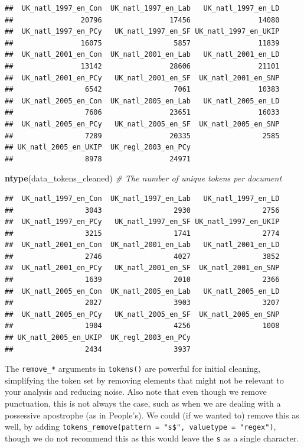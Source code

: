 \documentclass[
]{book}
\newenvironment{Shaded}{\begin{snugshade}}{\end{snugshade}}
\newcommand{\CommentTok}[1]{\textcolor[rgb]{0.56,0.35,0.01}{\textit{#1}}}
\newcommand{\FunctionTok}[1]{\textcolor[rgb]{0.13,0.29,0.53}{\textbf{#1}}}
\newcommand{\NormalTok}[1]{#1}
\begin{document}
\begin{verbatim}
##  UK_natl_1997_en_Con  UK_natl_1997_en_Lab   UK_natl_1997_en_LD 
##                20796                17456                14080 
##  UK_natl_1997_en_PCy   UK_natl_1997_en_SF UK_natl_1997_en_UKIP 
##                16075                 5857                11839 
##  UK_natl_2001_en_Con  UK_natl_2001_en_Lab   UK_natl_2001_en_LD 
##                13142                28606                21101 
##  UK_natl_2001_en_PCy   UK_natl_2001_en_SF  UK_natl_2001_en_SNP 
##                 6542                 7061                10383 
##  UK_natl_2005_en_Con  UK_natl_2005_en_Lab   UK_natl_2005_en_LD 
##                 7606                23651                16033 
##  UK_natl_2005_en_PCy   UK_natl_2005_en_SF  UK_natl_2005_en_SNP 
##                 7289                20335                 2585 
## UK_natl_2005_en_UKIP  UK_regl_2003_en_PCy 
##                 8978                24971
\end{verbatim}

\begin{Shaded}
\begin{Highlighting}[]
\FunctionTok{ntype}\NormalTok{(data\_tokens\_cleaned) }\CommentTok{\# The number of unique tokens per document}
\end{Highlighting}
\end{Shaded}

\begin{verbatim}
##  UK_natl_1997_en_Con  UK_natl_1997_en_Lab   UK_natl_1997_en_LD 
##                 3043                 2930                 2756 
##  UK_natl_1997_en_PCy   UK_natl_1997_en_SF UK_natl_1997_en_UKIP 
##                 3215                 1741                 2774 
##  UK_natl_2001_en_Con  UK_natl_2001_en_Lab   UK_natl_2001_en_LD 
##                 2746                 4027                 3852 
##  UK_natl_2001_en_PCy   UK_natl_2001_en_SF  UK_natl_2001_en_SNP 
##                 1639                 2010                 2366 
##  UK_natl_2005_en_Con  UK_natl_2005_en_Lab   UK_natl_2005_en_LD 
##                 2027                 3903                 3207 
##  UK_natl_2005_en_PCy   UK_natl_2005_en_SF  UK_natl_2005_en_SNP 
##                 1904                 4256                 1008 
## UK_natl_2005_en_UKIP  UK_regl_2003_en_PCy 
##                 2434                 3937
\end{verbatim}

The \texttt{remove\_*} arguments in \texttt{tokens()} are powerful for initial cleaning, simplifying the token set by removing elements that might not be relevant to your analysis and reducing noise. Also note that even though we remove punctuation, this is not always the case, such as when we are dealing with a possessive apostrophe (as in People's). We could (if we wanted to) remove this as well, by adding \texttt{tokens\_remove(pattern\ =\ "\textquotesingle{}s\$",\ valuetype\ =\ "regex")}, though we do not recommend this as this would leave the \texttt{s} as a single character.
\end{document}
